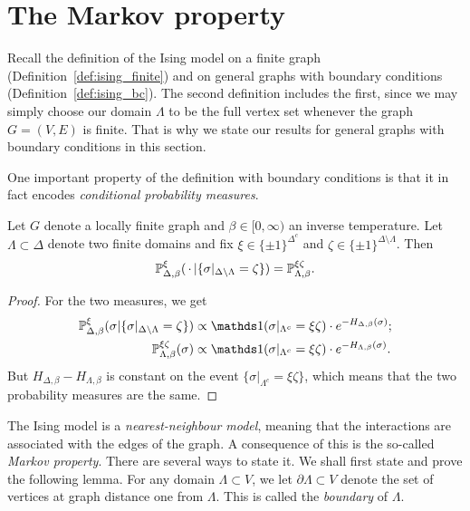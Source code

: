 \section{The Markov property}

Recall the definition of the Ising model on a finite graph
(Definition~\ref{def:ising_finite})
and on general graphs with boundary conditions (Definition~\ref{def:ising_bc}).
The second definition includes the first, since we may simply 
choose our domain $\Lambda$ to be the full vertex set whenever the
graph $G=(V,E)$ is finite.
That is why we state our results for general graphs with boundary conditions
in this section.

One important property of the definition with boundary conditions is that
it in fact encodes \emph{conditional probability measures}.

\begin{lemma}
    \label{lemma:boundary_conditions_conditional_measures}
    Let $G$ denote a locally finite graph and $\beta\in[0,\infty)$
    an inverse temperature.
    Let $\Lambda\subset\Delta$ denote two finite domains
    and fix $\xi\in\{\pm1\}^{\Delta^c}$
    and $\zeta\in\{\pm1\}^{\Delta\setminus\Lambda}$.
    Then
    \[
        \mathbb P_{\Delta,\beta}^\xi(\,\cdot\,|\{\sigma|_{\Delta\setminus\Lambda}=\zeta\})
        =
        \mathbb P_{\Lambda,\beta}^{\xi\zeta}.
    \]
\end{lemma}

\begin{proof}
    For the two measures, we get
    \begin{align}
        \P_{\Delta,\beta}^\xi(\sigma|\{\sigma|_{\Delta\setminus\Lambda}=\zeta\})
        &\propto\true{\sigma|_{\Lambda^c}=\xi\zeta}\cdot e^{-H_{\Delta,\beta}(\sigma)};
        \\\P_{\Lambda,\beta}^{\xi\zeta}(\sigma)
        &\propto\true{\sigma|_{\Lambda^c}=\xi\zeta}\cdot e^{-H_{\Lambda,\beta}(\sigma)}.
    \end{align}
    But $H_{\Delta,\beta}-H_{\Lambda,\beta}$ is constant on the
    event $\{\sigma|_{\Lambda^c}=\xi\zeta\}$,
    which means that the two probability measures are the same.
\end{proof}

The Ising model is a \emph{nearest-neighbour model},
meaning that the interactions are associated with the edges of the graph.
A consequence of this is the so-called \emph{Markov property}.
There are several ways to state it.
We shall first state and prove the following lemma.
For any domain $\Lambda\subset V$,
we let $\partial\Lambda\subset V$ denote the set of vertices
at graph distance one from $\Lambda$.
This is called the \emph{boundary} of $\Lambda$.

